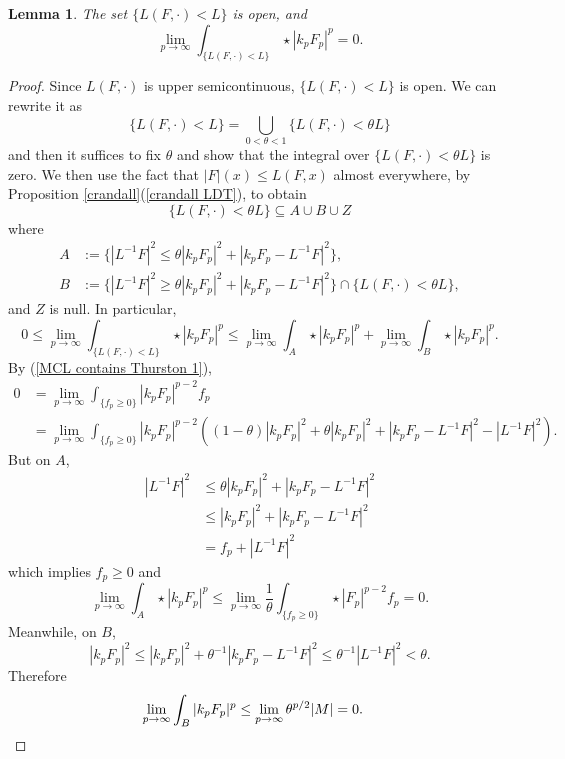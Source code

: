 \documentclass[reqno,11pt]{amsart}
\newtheorem{lemma}[theorem]{Lemma}
\theoremstyle{definition}
\numberwithin{equation}{section}
\begin{document}
\begin{lemma}\label{MCL contains Thurston lemma}
The set $\{L(F, \cdot) < L\}$ is open, and
$$\lim_{p \to \infty} \int_{\{L(F, \cdot) < L\}} \star |k_p F_p|^p = 0.$$
\end{lemma}
\begin{proof}
Since $L(F, \cdot)$ is upper semicontinuous, $\{L(F, \cdot) < L\}$ is open.
We can rewrite it as 
$$\{L(F, \cdot) < L\} = \bigcup_{0 < \theta < 1} \{L(F, \cdot) < \theta L\}$$
and then it suffices to fix $\theta$ and show that the integral over $\{L(F, \cdot) < \theta L\}$ is zero.
We then use the fact that $|F|(x) \leq L(F, x)$ almost everywhere, by Proposition \ref{crandall}(\ref{crandall LDT}), to obtain
$$\{L(F, \cdot) < \theta L\} \subseteq A \cup B \cup Z$$
where 
\begin{align*}
A &:= \{|L^{-1} F|^2 \leq \theta |k_p F_p|^2 + |k_p F_p - L^{-1} F|^2\}, \\
B &:= \{|L^{-1} F|^2 \geq \theta |k_p F_p|^2 + |k_p F_p - L^{-1} F|^2\} \cap \{L(F, \cdot) < \theta L\},
\end{align*}
and $Z$ is null. 
In particular,
$$0 \leq \lim_{p \to \infty} \int_{\{L(F, \cdot) < L\}} \star |k_p F_p|^p \leq \lim_{p \to \infty} \int_A \star |k_p F_p|^p + \lim_{p \to \infty} \int_B \star |k_p F_p|^p.$$
By (\ref{MCL contains Thurston 1}),
\begin{align*}
0 &= \lim_{p \to \infty} \int_{\{f_p \geq 0\}} |k_p F_p|^{p - 2} f_p \\
&= \lim_{p \to \infty} \int_{\{f_p \geq 0\}} |k_p F_p|^{p - 2}((1 - \theta) |k_p F_p|^2 + \theta |k_p F_p|^2 + |k_p F_p - L^{-1} F|^2 - |L^{-1} F|^2).
\end{align*}
But on $A$,
\begin{align*}
|L^{-1} F|^2 &\leq \theta |k_p F_p|^2 + |k_p F_p - L^{-1} F|^2 \\
&\leq |k_p F_p|^2 + |k_p F_p - L^{-1} F|^2 \\
&= f_p + |L^{-1} F|^2
\end{align*}
which implies $f_p \geq 0$ and 
$$\lim_{p \to \infty} \int_A \star |k_p F_p|^p \leq \lim_{p \to \infty} \frac{1}{\theta} \int_{\{f_p \geq 0\}} \star |F_p|^{p - 2} f_p = 0.$$
Meanwhile, on $B$,
$$|k_p F_p|^2 \leq |k_p F_p|^2 + \theta^{-1} |k_p F_p - L^{-1} F|^2 \leq \theta^{-1} |L^{-1} F|^2 < \theta.$$
Therefore
\begin{align*}
	\lim_{p \to \infty} \int_B |k_p F_p|^p &\leq \lim_{p \to \infty} \theta^{p/2} |M| = 0. \qedhere
\end{align*}
\end{proof}
\end{document}
